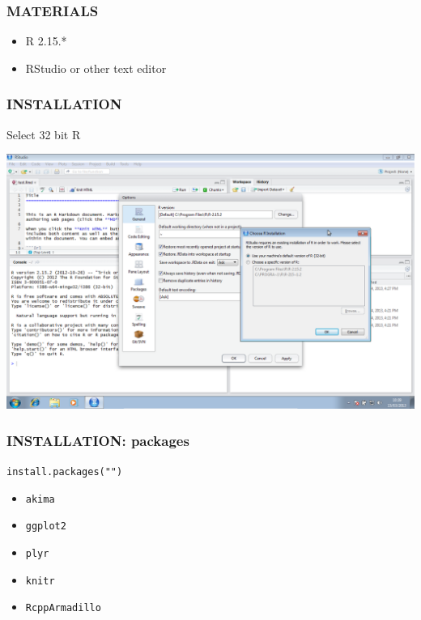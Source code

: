\documentclass[ignorenonframetext,]{beamer}
\begin{document}
\begin{frame}\frametitle{MATERIALS}

\begin{itemize}
\item
  R 2.15.*
\item
  RStudio or other text editor
\end{itemize}
\end{frame}

\begin{frame}\frametitle{INSTALLATION}

\begin{block}{Select 32 bit R}

\includegraphics[keepaspectratio, width=\textwidth]{graphics/RStudio.png}

\end{block}

\end{frame}

\begin{frame}[fragile]\frametitle{INSTALLATION: packages}

\texttt{install.packages("")}

\begin{itemize}
\item
  \texttt{akima}
\item
  \texttt{ggplot2}
\item
  \texttt{plyr}
\item
  \texttt{knitr}
\item
  \texttt{RcppArmadillo}
\end{itemize}
\end{frame}
\end{document}

